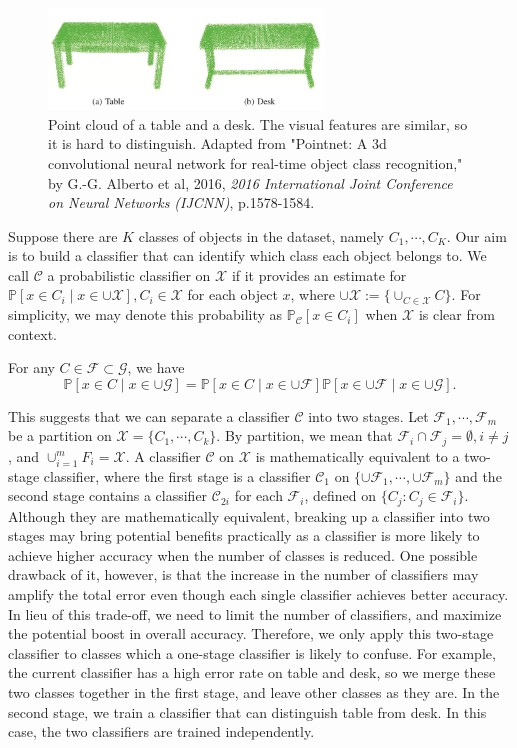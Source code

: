 \documentclass{article}
\begin{document}
\begin{figure}[h]
  \caption{Point cloud of a table and a desk. The visual features are similar, so it is hard to distinguish. Adapted from "Pointnet: A 3d convolutional neural network for real-time object class recognition," by G.-G. Alberto et al, 2016, \textit{2016 International Joint Conference on Neural Networks (IJCNN)}, p.1578-1584.}
  \label{deskandtable}
  \centering
  \includegraphics[width=0.65\textwidth]{desk&table.png}
\end{figure}

Suppose there are $K$ classes of objects in the dataset, namely $C_1, \cdots, C_K$. Our aim is to build a classifier that can identify which class each object belongs to. We call $\mathcal{C}$ a probabilistic classifier on $\mathcal{X}$ if it provides an estimate for $\mathbb{P}[x\in C_i\mid x\in \cup\mathcal{X}], C_i \in \mathcal{X}$ for each object $x$, where $\cup\mathcal{X} := \{\cup_{C\in \mathcal{X}} C\}$. For simplicity, we may denote this probability as $\mathbb{P}_\mathcal{C}[x\in C_i]$ when $\mathcal{X}$ is clear from context. 

For any $C \in \mathcal{F} \subset \mathcal{G}$, we have $$\mathbb{P}[x\in C\mid x\in \cup \mathcal{G}] = \mathbb{P}[x\in C\mid x\in\cup \mathcal{F}]\mathbb{P}[x\in \cup\mathcal{F}\mid x\in \cup\mathcal{G}].$$ 

This suggests that we can separate a classifier $\mathcal{C}$ into two stages. Let $\mathcal{F}_1,\cdots, \mathcal{F}_m$ be a partition on $\mathcal{X} = \{C_1,\cdots, C_k\}$. By partition, we mean that $\mathcal{F}_i\cap \mathcal{F}_j = \emptyset, i\neq j$, and $\cup_{i=1}^m F_i = \mathcal{X}$. A classifier $\mathcal{C}$ on $\mathcal{X}$ is mathematically equivalent to a two-stage classifier, where the first stage is a classifier $\mathcal{C}_1$ on $\{\cup\mathcal{F}_1, \cdots, \cup\mathcal{F}_m\}$ and the second stage contains a classifier $\mathcal{C}_{2i}$ for each $\mathcal{F}_i$, defined on $\{C_j: C_j\in \mathcal{F}_i\}$. Although they are mathematically equivalent, breaking up a classifier into two stages may bring potential benefits practically as a classifier is more likely to achieve higher accuracy when the number of classes is reduced. One possible drawback of it, however, is that the increase in the number of classifiers may amplify the total error even though each single classifier achieves better accuracy. In lieu of this trade-off, we need to limit the number of classifiers, and maximize the potential boost in overall accuracy. Therefore, we only apply this two-stage classifier to classes which a one-stage classifier is likely to confuse. For example, the current classifier has a high error rate on table and desk, so we merge these two classes together in the first stage, and leave other classes as they are. In the second stage, we train a classifier that can distinguish table from desk. In this case, the two classifiers are trained independently. 
\end{document}
